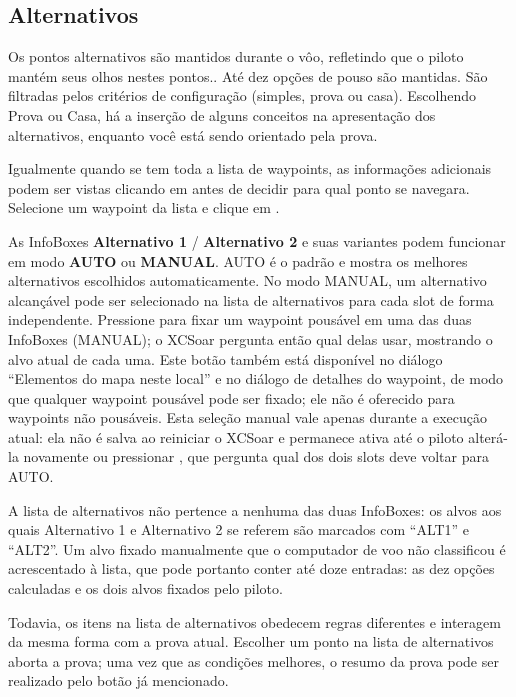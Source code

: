 \subsection*{Alternativos} \label{sec:alternates}
Os pontos alternativos são mantidos durante o vôo, refletindo que o piloto mantém seus olhos nestes pontos..  Até dez opções de pouso são mantidas.  São filtradas pelos critérios de configuração (simples, prova ou casa).  
Escolhendo Prova ou Casa, há a inserção de alguns conceitos na apresentação dos alternativos, enquanto você está sendo orientado pela prova. 

Igualmente quando se tem toda a lista de waypoints, as informações adicionais podem ser vistas clicando em  antes de decidir para qual ponto se navegara.  Selecione um waypoint da lista e clique em .

As InfoBoxes \textbf{Alternativo 1} / \textbf{Alternativo 2} e suas variantes
podem funcionar em modo \textbf{AUTO} ou \textbf{MANUAL}. AUTO é o padrão e
mostra os melhores alternativos escolhidos automaticamente. No modo MANUAL, um
alternativo alcançável pode ser selecionado na lista de alternativos para cada
slot de forma independente. Pressione 
para fixar um waypoint pousável em uma das duas InfoBoxes (MANUAL); o
\textsf{XCSoar} pergunta então qual delas usar, mostrando o alvo atual de cada
uma. Este botão também está disponível no diálogo ``Elementos do mapa neste
local'' e no diálogo de detalhes do waypoint, de modo que qualquer waypoint
pousável pode ser fixado; ele não é oferecido para waypoints não pousáveis.
Esta seleção manual vale apenas durante a execução
atual: ela não é salva ao reiniciar o \textsf{XCSoar} e permanece ativa até o
piloto alterá-la novamente ou pressionar , que
pergunta qual dos dois slots deve voltar para AUTO.

A lista de alternativos não pertence a nenhuma das duas InfoBoxes: os alvos aos
quais Alternativo 1 e Alternativo 2 se referem são marcados com ``ALT1'' e
``ALT2''. Um alvo fixado manualmente que o computador de voo não classificou é
acrescentado à lista, que pode portanto conter até doze entradas: as dez opções
calculadas e os dois alvos fixados pelo piloto.

Todavia, os itens na lista de alternativos obedecem regras diferentes e interagem da mesma forma com a prova atual.  Escolher um ponto na lista de alternativos aborta a prova; uma vez que as condições melhores, o resumo da prova pode ser realizado pelo botão já mencionado.


